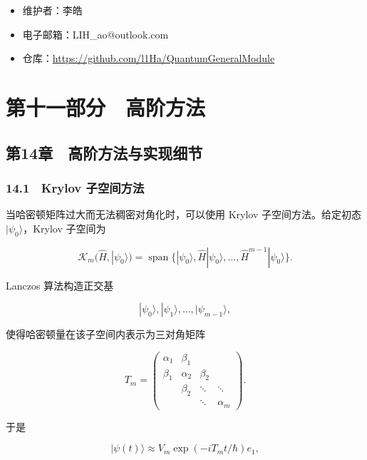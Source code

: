 \documentclass[
]{ctexbook}
\providecommand{\tightlist}{%
  \setlength{\itemsep}{0pt}\setlength{\parskip}{0pt}}
\let\origsection\section
\renewcommand{\section}[1]{%
  \needspace{9\baselineskip}%
  \origsection{#1}%
}
\let\origsubsection\subsection
\renewcommand{\subsection}[1]{%
  \needspace{6\baselineskip}%
  \origsubsection{#1}%
}
\begin{document}
\begin{itemize}
\tightlist
\item
  维护者：李皓
\item
  电子邮箱：LIH\_ao@outlook.com
\item
  仓库：\url{https://github.com/l1Ha/QuantumGeneralModule}
\end{itemize}

\hypertarget{ux7b2cux5341ux4e00ux90e8ux5206-ux9ad8ux9636ux65b9ux6cd5}{%
\section{第十一部分　高阶方法}\label{ux7b2cux5341ux4e00ux90e8ux5206-ux9ad8ux9636ux65b9ux6cd5}}

\hypertarget{ux7b2c14ux7ae0-ux9ad8ux9636ux65b9ux6cd5ux4e0eux5b9eux73b0ux7ec6ux8282}{%
\subsection{第14章　高阶方法与实现细节}\label{ux7b2c14ux7ae0-ux9ad8ux9636ux65b9ux6cd5ux4e0eux5b9eux73b0ux7ec6ux8282}}

\hypertarget{krylov-ux5b50ux7a7aux95f4ux65b9ux6cd5}{%
\subsubsection{14.1　Krylov
子空间方法}\label{krylov-ux5b50ux7a7aux95f4ux65b9ux6cd5}}

当哈密顿矩阵过大而无法稠密对角化时，可以使用 Krylov 子空间方法。给定初态
\(|\psi_0\rangle\)，Krylov 子空间为

\[
\mathcal K_m(\hat H,|\psi_0\rangle)
=
\operatorname{span}
\{
|\psi_0\rangle,
\hat H|\psi_0\rangle,
\ldots,
\hat H^{m-1}|\psi_0\rangle
\}.
\]

Lanczos 算法构造正交基

\[
|\psi_0\rangle,|\psi_1\rangle,\ldots,|\psi_{m-1}\rangle,
\]

使得哈密顿量在该子空间内表示为三对角矩阵

\[
T_m
=
\begin{pmatrix}
\alpha_1 & \beta_1 &        &        \\
\beta_1 & \alpha_2 & \beta_2 &        \\
        & \beta_2 & \ddots & \ddots \\
        &        & \ddots & \alpha_m
\end{pmatrix}.
\]

于是

\[
|\psi(t)\rangle
\approx
V_m
\exp(-i T_m t/\hbar)
e_1,
\]
\end{document}

